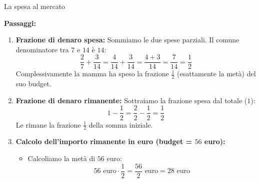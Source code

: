 \begin{esercizio}{La spesa al mercato}
\begin{soluzione}
  \textbf{Passaggi:}
  \begin{enumerate}[label=\alph*)]
    \item \textbf{Frazione di denaro spesa:} Sommiamo le due spese parziali. Il comune denominatore tra $7$ e $14$ è $14$:
      \[
      \frac{2}{7} + \frac{3}{14} = \frac{4}{14} + \frac{3}{14} = \frac{4+3}{14} = \frac{7}{14} = \frac{1}{2}
      \]
      Complessivamente la mamma ha speso la frazione $\frac{1}{2}$ (esattamente la metà) del suo budget.
    \item \textbf{Frazione di denaro rimanente:} Sottraiamo la frazione spesa dal totale ($1$):
      \[
      1 - \frac{1}{2} = \frac{2}{2} - \frac{1}{2} = \frac{1}{2}
      \]
      Le rimane la frazione $\frac{1}{2}$ della somma iniziale.
    \item \textbf{Calcolo dell'importo rimanente in euro (budget = $56$ euro):}
      \begin{itemize}
        \item Calcoliamo la metà di $56$ euro:
          \[
          56\text{ euro} \cdot \frac{1}{2} = \frac{56}{2}\text{ euro} = 28\text{ euro}
          \]
      \end{itemize}
  \end{enumerate}
\end{soluzione}
\end{esercizio}

\condnewpage



